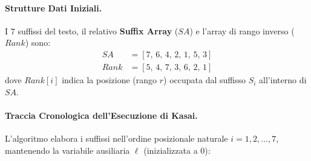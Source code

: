 \paragraph{Strutture Dati Iniziali.}
I $7$ suffissi del testo, il relativo \textbf{Suffix Array} ($SA$) e l'array di rango inverso ($Rank$) sono:
\begin{align}
  SA &= [7, \, 6, \, 4, \, 2, \, 1, \, 5, \, 3] \\
  Rank &= [5, \, 4, \, 7, \, 3, \, 6, \, 2, \, 1]
\end{align}
dove $Rank[i]$ indica la posizione (rango $r$) occupata dal suffisso $S_i$ all'interno di $SA$.

\paragraph{Traccia Cronologica dell'Esecuzione di Kasai.}
L'algoritmo elabora i suffissi nell'ordine posizionale naturale $i = 1, 2, \dots, 7$, mantenendo la variabile ausiliaria $\ell$ (inizializzata a $0$):
